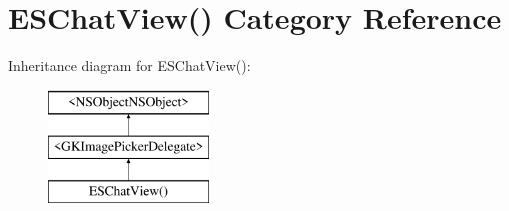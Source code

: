 \hypertarget{category_e_s_chat_view_07_08}{}\section{E\+S\+Chat\+View() Category Reference}
\label{category_e_s_chat_view_07_08}
Inheritance diagram for E\+S\+Chat\+View()\+:\begin{figure}[H]
\begin{center}
\leavevmode
\includegraphics[height=3.000000cm]{category_e_s_chat_view_07_08}
\end{center}
\end{figure}
